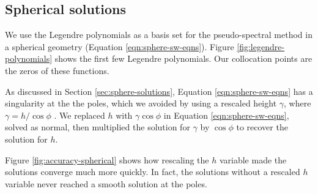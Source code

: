 \subsection*{Spherical solutions}\label{sec:app-spherical}

We use the Legendre polynomials as a basis set for the pseudo-spectral method in a spherical geometry (Equation \ref{eqn:sphere-sw-eqns}). Figure \ref{fig:legendre-polynomials} shows the first few Legendre polynomials. Our collocation points are the zeros of these functions.

As discussed in Section \ref{sec:sphere-solutions}, Equation \ref{eqn:sphere-sw-eqns} has a singularity at the the poles, which we avoided by using a rescaled height $\gamma$, where $\gamma = h / \cos\phi$ \citep{iga2005spherical}. We replaced $h$ with $\gamma \cos \phi$ in Equation \ref{eqn:sphere-sw-eqns}, solved as normal, then multiplied the solution for $\gamma$ by $\cos\phi$ to recover the solution for $h$.

Figure \ref{fig:accuracy-spherical} shows how rescaling the $h$ variable made the solutions converge much more quickly. In fact, the solutions without a rescaled $h$ variable never reached a smooth solution at the poles.


